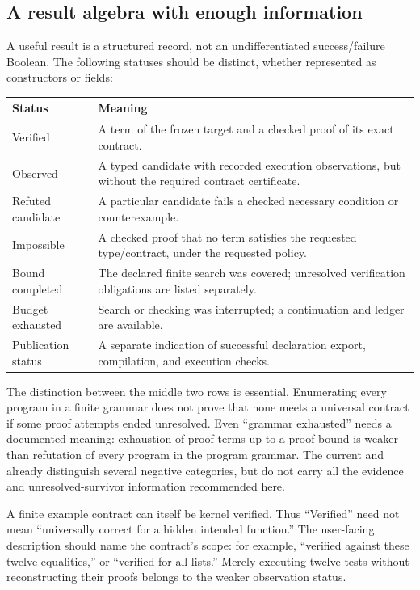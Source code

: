 \subsection{A result algebra with enough information}

A useful result is a structured record, not an undifferentiated success/failure Boolean. The following statuses should be distinct, whether represented as constructors or fields:

\begin{center}\small
\begin{tabularx}{\textwidth}{@{}L{36mm}Y@{}}\toprule
Status & Meaning\\\midrule
Verified & A term of the frozen target and a checked proof of its exact contract.\\
Observed & A typed candidate with recorded execution observations, but without the required contract certificate.\\
Refuted candidate & A particular candidate fails a checked necessary condition or counterexample.\\
Impossible & A checked proof that no term satisfies the requested type/contract, under the requested policy.\\
Bound completed & The declared finite search was covered; unresolved verification obligations are listed separately.\\
Budget exhausted & Search or checking was interrupted; a continuation and ledger are available.\\
Publication status & A separate indication of successful declaration export, compilation, and execution checks.\\\bottomrule
\end{tabularx}
\end{center}

The distinction between the middle two rows is essential. Enumerating every program in a finite grammar does not prove that none meets a universal contract if some proof attempts ended unresolved. Even ``grammar exhausted'' needs a documented meaning: exhaustion of proof terms up to a proof bound is weaker than refutation of every program in the program grammar. The current  and  already distinguish several negative categories, but do not carry all the evidence and unresolved-survivor information recommended here.\cite{implementation}

A finite example contract can itself be kernel verified. Thus ``Verified'' need not mean ``universally correct for a hidden intended function.'' The user-facing description should name the contract's scope: for example, ``verified against these twelve equalities,'' or ``verified for all lists.'' Merely executing twelve tests without reconstructing their proofs belongs to the weaker observation status.

